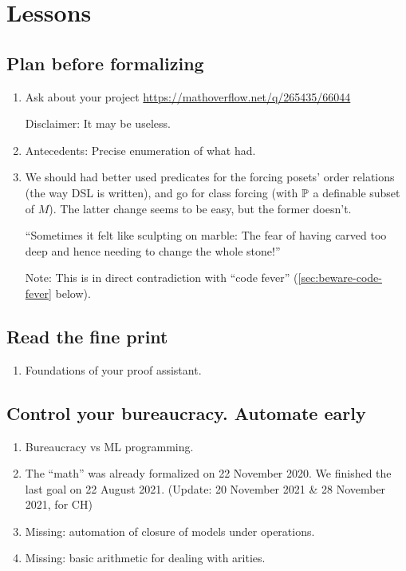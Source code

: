 \section{Lessons}\label{sec:lessons}

\subsection{Plan before formalizing}
\begin{enumerate}
\item Ask about your project
  \url{https://mathoverflow.net/q/265435/66044}

  Disclaimer: It may be useless.
\item Antecedents: Precise enumeration of what  had.

\item We should had better used predicates for the forcing posets'
  order relations (the way DSL is written), and go for class forcing
  (with $\mathbb{P}$ a definable subset of $M$). The latter change seems to be
  easy, but the former doesn't.
  
  “Sometimes it felt like sculpting on marble: The fear of having
  carved too deep and hence needing to change the whole stone!”

  Note: This is in direct contradiction with “code fever”
  (\ref{sec:beware-code-fever} below).
\end{enumerate}

\subsection{Read the fine print}
\begin{enumerate}
\item Foundations of your proof assistant.
\end{enumerate}

\subsection{Control your bureaucracy. Automate early}
\begin{enumerate}
\item Bureaucracy vs ML programming.
\item The “math” was already formalized on 22 November 2020.
  We finished the last goal on 22 August 2021.
  (Update: 20 November 2021 \& 28 November 2021, for CH)
\item Missing: automation of closure of models under operations.
\item Missing: basic arithmetic for dealing with arities.
\end{enumerate}


